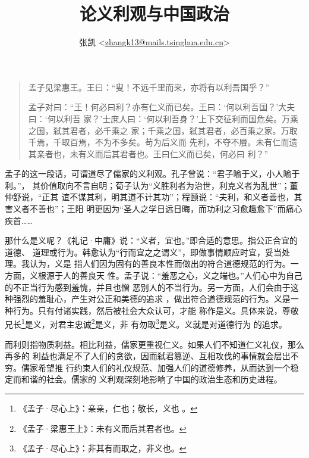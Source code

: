 

\title{\FZLiuKai 论义利观与中国政治}
\author{{\FZLiuKai 张凯}
<\href{mailto:zhangk13@mails.tsinghua.edu.cn}{zhangk13@mails.tsinghua.edu.cn}>}


\maketitle
\tableofcontents

\section*{}

\begin{quotation}

孟子见梁惠王。王曰：“叟！不远千里而来，亦将有以利吾国乎？”

孟子对曰：“王！何必曰利？亦有仁义而已矣。王曰：‘何以利吾国？’大夫曰：‘何以利吾
家？’士庶人曰：‘何以利吾身？’上下交征利而国危矣。万乘之国，弑其君者，必千乘之
家；千乘之国，弑其君者，必百乘之家。万取千焉，千取百焉，不为不多矣。苟为后义而
先利，不夺不餍。未有仁而遗其亲者也，未有义而后其君者也。王曰仁义而已矣，何必曰
利？”\parencite{wjwk-mz-lhws}

\end{quotation}

孟子的这一段话，可谓道尽了儒家的义利观。孔子曾说：“君子喻于义，小人喻于利。”，
其价值取向不言自明；荀子认为“义胜利者为治世，利克义者为乱世”；董仲舒说，“正其
谊不谋其利，明其道不计其功”；程颐说：“夫利，和义者善也，其害义者不善也”；王阳
明更因为“圣人之学日远日晦，而功利之习愈趣愈下”而痛心疾首……

那什么是义呢？《礼记·中庸》说：“义者，宜也。”即合适的意思。指公正合宜的道德、
道理或行为。韩愈认为“行而宜之之谓义”，即做事情顺应时宜，妥当处理。我认为，义是
指人们因为固有的善良本性而做出的符合道德规范的行为。一方面，义根源于人的善良天
性。孟子说：“羞恶之心，义之端也。”人们心中为自己的不正当行为感到羞愧，并且也憎
恶别人的不当行为。另一方面，人们会由于这种强烈的羞耻心，产生对公正和美德的追求
，做出符合道德规范的行为。义是一种行为。只有付诸实践，然后被社会大众认可，才能
称作是义。具体来说，尊敬兄长\footnote{《孟子·尽心上》：亲亲，仁也；敬长，义也
。}是义，对君主忠诚\footnote{《孟子·梁惠王上》：未有义而后其君者也。}是义，非
有勿取\footnote{《孟子·尽心上》：非其有而取之，非义也。}是义。义就是对道德行为
的追求。

而利则指物质利益。相比利益，儒家更重视仁义。如果人们不知道仁义礼仪，那么再多的
利益也满足不了人们的贪欲，因而弑君篡逆、互相攻伐的事情就会层出不穷。儒家希望推
行约束人们的礼仪规范、加强人们的道德修养，从而达到一个稳定而和谐的社会。儒家的
义利观深刻地影响了中国的政治生态和历史进程。


